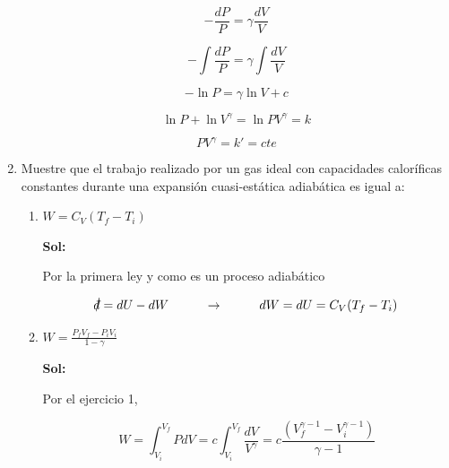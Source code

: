 \documentclass[12pt,a4paper]{article}
\newcommand{\dbar}{\mathchar'26\mkern-12mu d}
\begin{document}
\begin{enumerate}
     \begin{equation*}
         -  \frac{dP}{P}= \gamma \frac{dV}{V}
     \end{equation*}
     
     \begin{equation*}
        -\int \frac{d P}{P} =\gamma \int \frac{dV}{V} 
     \end{equation*}
     
     \begin{equation*}
         -\ln{P} =  \gamma \ln{V} + c
     \end{equation*}
     
     \begin{equation*}
         \ln{P}+\ln{V^{\gamma}} =  \ln{PV^{\gamma}}= k
     \end{equation*}
     
     \begin{equation*}
         P V^{\gamma} = k' = cte
     \end{equation*}
     
     
    
    
    
    
    \item Muestre que el trabajo realizado por un gas ideal con capacidades caloríficas constantes durante una expansión cuasi-estática adiabática es igual a:
    
    \begin{enumerate}
        \item $W = C_V (T_f - T_i)$
        
        \textbf{Sol:}
        
        Por la primera ley y como es un proceso adiabático
        
        \begin{equation*}
            \cancel{\dbar} = dU - dW \hspace{1cm} \rightarrow \hspace{1cm} dW = dU = C_V (T_f - T_i) 
        \end{equation*}
        
        
        \item $W = \frac{P_f V_f - P_i V_i}{1-\gamma}$
        
        \textbf{Sol:}
        
        Por el ejercicio 1,
        
        \begin{equation*}
            W = \int_{V_i}^{V_f} PdV = c \int_{V_i}^{V_f} \frac{dV}{V^{\gamma}} = c\frac{(V_{f}^{\gamma - 1} - V_{i} ^{\gamma - 1})}{\gamma - 1}
        \end{equation*}
        

\end{enumerate}
\end{enumerate}
\end{document}
